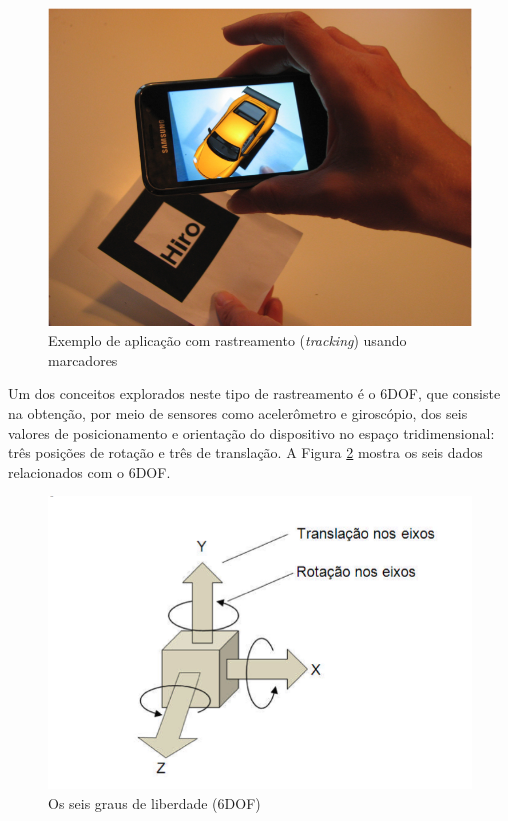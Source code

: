 \begin{figure}[h!]
    \centering
    \caption{Exemplo de aplicação com rastreamento (\textit{tracking}) usando marcadores}
    \label{fig:AR-marker-example1}
    \includegraphics[width=15cm]{resources/marker-tracking-example1.png}
\end{figure}



\label{def:6dof}
Um dos conceitos explorados neste tipo de rastreamento é o \gls{6DOF},
que consiste na obtenção, por meio de sensores como acelerômetro e giroscópio, 
dos seis valores de posicionamento e orientação do dispositivo no espaço
tridimensional: três posições de rotação e três de translação. A Figura 
\ref{fig:6dof_data} mostra os seis dados relacionados com o \gls{6DOF}.

\begin{figure}[h!]
    \centering
    \caption{Os seis graus de liberdade (6DOF)}
    \label{fig:6dof_data}
    \includegraphics[width=15cm]{resources/6DoF-ptbr.png}
\end{figure}



